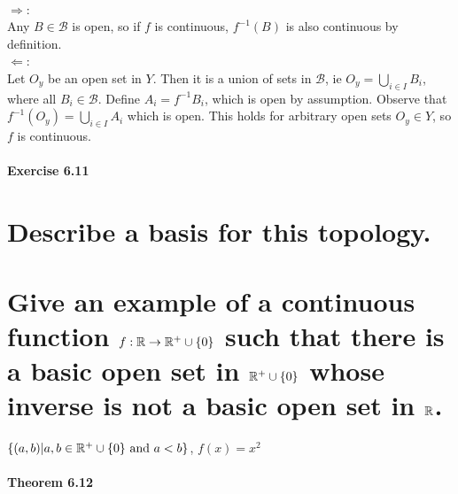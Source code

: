 \begin{solution}
 \\$\Rightarrow$: \\
 Any $B \in \mathcal{B}$ is open, so if $f$ is continuous, $f^{-1}(B)$ is also continuous by definition. \\
 $\Leftarrow$: \\
 Let $O_y$ be an open set in $Y$. Then it is a union of sets in $\mathcal{B}$, ie $O_y = \bigcup_{i \in I} B_i$, where all $B_i \in \mathcal{B}$. Define $A_i = f^{-1}B_i$, which is open by assumption. Observe that $f^{-1}(O_y) = \bigcup_{i \in I} A_i$ which is open. This holds for arbitrary open sets $O_y \in Y$, so $f$ is continuous.
\end{solution}

\subsection{Exercise 6.11}
\setcounter{question}{0}


\begin{parts}
 \part{Describe a basis for this topology.}
 \part{Give an example of a continuous function $f:\mathbb{R} \rightarrow \mathbb{R}^+ \cup \{0\}$ such that there is a basic open set in $\mathbb{R}^+ \cup \{0\}$ whose inverse is not a basic open set in $\mathbb{R}$.}
 \end{parts}
 
\begin{solution}
 $\{(a,b)|a,b \in \mathbb{R}^+ \cup \{0\} \text{ and } a < b\}$, $f(x) = x^2$
\end{solution}

\subsection{Theorem 6.12}
\setcounter{question}{0}


